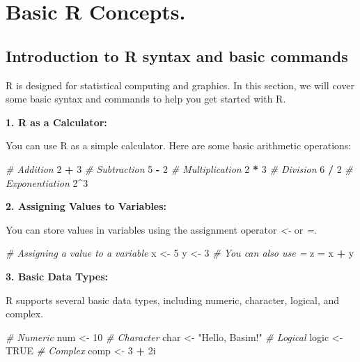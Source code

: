 \documentclass[
]{book}
\newenvironment{Shaded}{\begin{snugshade}}{\end{snugshade}}
\newcommand{\CommentTok}[1]{\textcolor[rgb]{0.56,0.35,0.01}{\textit{#1}}}
\newcommand{\ConstantTok}[1]{\textcolor[rgb]{0.56,0.35,0.01}{#1}}
\newcommand{\DataTypeTok}[1]{\textcolor[rgb]{0.13,0.29,0.53}{#1}}
\newcommand{\DecValTok}[1]{\textcolor[rgb]{0.00,0.00,0.81}{#1}}
\newcommand{\NormalTok}[1]{#1}
\newcommand{\OtherTok}[1]{\textcolor[rgb]{0.56,0.35,0.01}{#1}}
\newcommand{\SpecialCharTok}[1]{\textcolor[rgb]{0.81,0.36,0.00}{\textbf{#1}}}
\newcommand{\StringTok}[1]{\textcolor[rgb]{0.31,0.60,0.02}{#1}}
\begin{document}
\section{Basic R Concepts.}\label{basic-r-concepts.}

\subsection{Introduction to R syntax and basic commands}\label{introduction-to-r-syntax-and-basic-commands}

R is designed for statistical computing and graphics. In this section, we will cover some basic syntax and commands to help you get started with R.

\textbf{1. R as a Calculator:}

You can use R as a simple calculator. Here are some basic arithmetic operations:

\begin{Shaded}
\begin{Highlighting}[]
\CommentTok{\# Addition}
\DecValTok{2} \SpecialCharTok{+} \DecValTok{3}
\CommentTok{\# Subtraction}
\DecValTok{5} \SpecialCharTok{{-}} \DecValTok{2}
\CommentTok{\# Multiplication}
\DecValTok{2} \SpecialCharTok{*} \DecValTok{3}
\CommentTok{\# Division}
\DecValTok{6} \SpecialCharTok{/} \DecValTok{2}
\CommentTok{\# Exponentiation}
\DecValTok{2}\SpecialCharTok{\^{}}\DecValTok{3}
\end{Highlighting}
\end{Shaded}

\textbf{2. Assigning Values to Variables:}

You can store values in variables using the assignment operator \emph{\textless-} or \emph{=}.

\begin{Shaded}
\begin{Highlighting}[]
\CommentTok{\# Assigning a value to a variable}
\NormalTok{x }\OtherTok{\textless{}{-}} \DecValTok{5}
\NormalTok{y }\OtherTok{\textless{}{-}} \DecValTok{3}
\CommentTok{\# You can also use =}
\NormalTok{z }\OtherTok{=}\NormalTok{ x }\SpecialCharTok{+}\NormalTok{ y}
\end{Highlighting}
\end{Shaded}

\textbf{3. Basic Data Types:}

R supports several basic data types, including numeric, character, logical, and complex.

\begin{Shaded}
\begin{Highlighting}[]
\CommentTok{\# Numeric}
\NormalTok{num }\OtherTok{\textless{}{-}} \DecValTok{10}
\CommentTok{\# Character}
\NormalTok{char }\OtherTok{\textless{}{-}} \StringTok{"Hello, Basim!"}
\CommentTok{\# Logical}
\NormalTok{logic }\OtherTok{\textless{}{-}} \ConstantTok{TRUE}
\CommentTok{\# Complex}
\NormalTok{comp }\OtherTok{\textless{}{-}} \DecValTok{3} \SpecialCharTok{+} \DecValTok{2}\DataTypeTok{i}
\end{Highlighting}
\end{Shaded}
\end{document}
